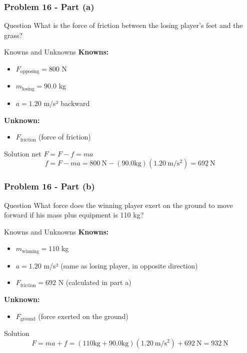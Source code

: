 \documentclass{beamer}
\begin{document}
\begin{}
\begin{frame}
\frametitle{Problem 16 - Part (a)}
\begin{block}{Question}
What is the force of friction between the losing player's feet and the grass?
\end{block}
\begin{block}{Knowns and Unknowns}
\textbf{Knowns:}
\begin{itemize}
    \item $F_{\text{opposing}} = 800$ N
    \item $m_{\text{losing}} = 90.0$ kg
    \item $a = 1.20$ m/s² backward
\end{itemize}
\textbf{Unknown:}
\begin{itemize}
    \item $F_{\text{friction}}$ (force of friction)
\end{itemize}
\end{block}
\begin{block}{Solution}
net $F = F - f = ma$
\begin{equation*}
f = F - ma = 800 \mathrm{~N} - (90.0 \mathrm{kg})(1.20 \mathrm{~m} / \mathrm{s}^{2}) = \underline{692 \mathrm{~N}}
\end{equation*}
\end{block}
\end{frame}

\begin{frame}
\frametitle{Problem 16 - Part (b)}
\begin{block}{Question}
What force does the winning player exert on the ground to move forward if his mass plus equipment is 110 kg?
\end{block}
\begin{block}{Knowns and Unknowns}
\textbf{Knowns:}
\begin{itemize}
    \item $m_{\text{winning}} = 110$ kg
    \item $a = 1.20$ m/s² (same as losing player, in opposite direction)
    \item $F_{\text{friction}} = 692$ N (calculated in part a)
\end{itemize}
\textbf{Unknown:}
\begin{itemize}
    \item $F_{\text{ground}}$ (force exerted on the ground)
\end{itemize}
\end{block}
\begin{block}{Solution}
\begin{equation*}
F = ma + f = (110 \mathrm{kg} + 90.0 \mathrm{kg})(1.20 \mathrm{~m} / \mathrm{s}^{2}) + 692 \mathrm{~N} = 932 \mathrm{~N}
\end{equation*}
\end{block}
\end{frame}



\end{}
\end{document}
